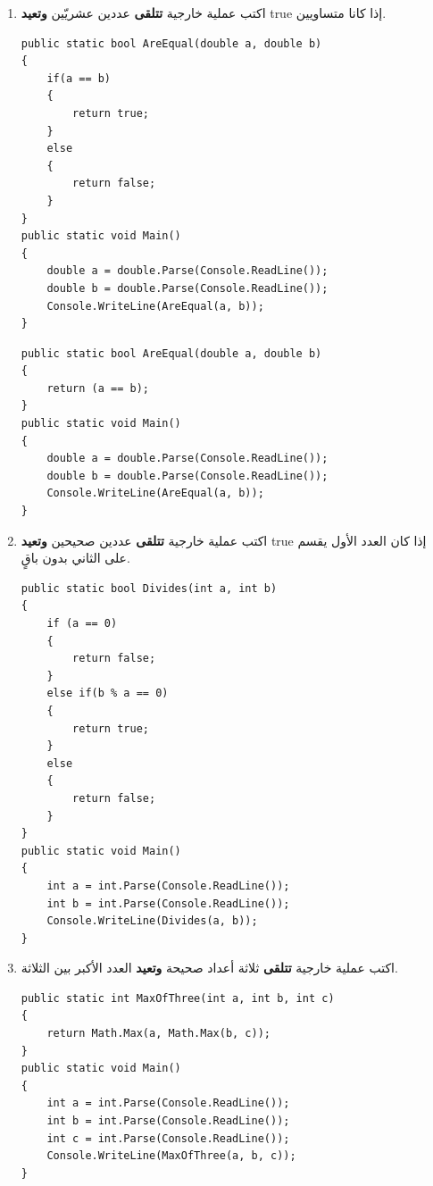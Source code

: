 ﻿\documentclass[14pt]{extarticle}
\begin{document}
\begin{enumerate}[itemsep=3em]
\begin{enumerate}
\item اكتب عملية خارجية \textbf{تتلقى} عددين عشريّين \textbf{وتعيد} \textenglish{true} إذا كانا متساويين.
\ifwithsols
\begin{boxSolution}[1]
\begin{english}
\begin{verbatim}
public static bool AreEqual(double a, double b)
{
    if(a == b)
    {
        return true;
    }
    else
    {
        return false;
    }
}
public static void Main()
{
    double a = double.Parse(Console.ReadLine());
    double b = double.Parse(Console.ReadLine());
    Console.WriteLine(AreEqual(a, b));
}
\end{verbatim}
\end{english}
\end{boxSolution}
\begin{boxSolution}[2]
\begin{english}
\begin{verbatim}
public static bool AreEqual(double a, double b)
{
    return (a == b);
}
public static void Main()
{
    double a = double.Parse(Console.ReadLine());
    double b = double.Parse(Console.ReadLine());
    Console.WriteLine(AreEqual(a, b));
}
\end{verbatim}
\end{english}
\end{boxSolution}
\clearpage
\fi


\item اكتب عملية خارجية \textbf{تتلقى} عددين صحيحين \textbf{وتعيد} \textenglish{true} إذا كان العدد الأول يقسم على الثاني بدون باقٍ.
\ifwithsols
\begin{boxSolution}
\begin{english}
\begin{verbatim}
public static bool Divides(int a, int b)
{
    if (a == 0)
    {
        return false;
    }
    else if(b % a == 0)
    {
        return true;
    }
    else
    {
        return false;
    }
}
public static void Main()
{
    int a = int.Parse(Console.ReadLine());
    int b = int.Parse(Console.ReadLine());
    Console.WriteLine(Divides(a, b));
}
\end{verbatim}
\end{english}
\end{boxSolution}
\clearpage
\fi


\item اكتب عملية خارجية \textbf{تتلقى} ثلاثة أعداد صحيحة \textbf{وتعيد} العدد الأكبر بين الثلاثة.
\ifwithsols
\begin{boxSolution}
\begin{english}
\begin{verbatim}
public static int MaxOfThree(int a, int b, int c)
{
    return Math.Max(a, Math.Max(b, c));
}
public static void Main()
{
    int a = int.Parse(Console.ReadLine());
    int b = int.Parse(Console.ReadLine());
    int c = int.Parse(Console.ReadLine());
    Console.WriteLine(MaxOfThree(a, b, c));
}
\end{verbatim}
\end{english}
\end{boxSolution}
\fi


\end{enumerate}
\end{enumerate}
\end{document}
